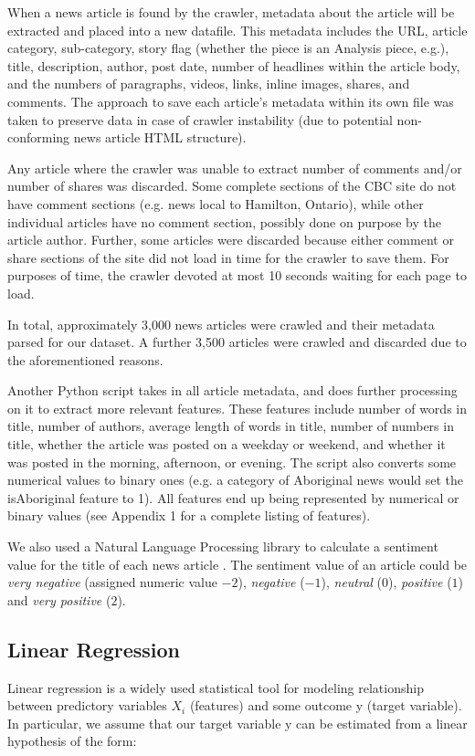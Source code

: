 \documentclass[conference,compsoc]{IEEEtran}
\begin{document}
When a news article is found by the crawler, metadata about the article will be extracted and placed into a new datafile. This metadata includes the URL, article category, sub-category, story flag (whether the piece is an Analysis piece, e.g.), title, description, author, post date, number of headlines within the article body, and the numbers of paragraphs, videos, links, inline images, shares, and comments. The approach to save each article's metadata within its own file was taken to preserve data in case of crawler instability (due to potential non-conforming news article HTML structure).

Any article where the crawler was unable to extract number of comments and/or number of shares was discarded. Some complete sections of the CBC site do not have comment sections (e.g. news local to Hamilton, Ontario), while other individual articles have no comment section, possibly done on purpose by the article author. Further, some articles were discarded because either comment or share sections of the site did not load in time for the crawler to save them. For purposes of time, the crawler devoted at most 10 seconds waiting for each page to load.

In total, approximately 3,000 news articles were crawled and their metadata parsed for our dataset. A further 3,500 articles were crawled and discarded due to the aforementioned reasons.

Another Python script takes in all article metadata, and does further processing on it to extract more relevant features. These features include number of words in title, number of authors, average length of words in title, number of numbers in title, whether the article was posted on a weekday or weekend, and whether it was posted in the morning, afternoon, or evening. The script also converts some numerical values to binary ones (e.g. a category of Aboriginal news would set the isAboriginal feature to 1). All features end up being represented by numerical or binary values (see Appendix 1 for a complete listing of features).

We also used a Natural Language Processing library to calculate a sentiment value for the title of each news article \cite{stanfordcorenlp}. The sentiment value of an article could be \textit{very negative} (assigned numeric value $-2$), \textit{negative} ($-1$), \textit{neutral} ($0$), \textit{positive} ($1$) and \textit{very positive} ($2$).

\subsection{Linear Regression}
Linear regression is a widely used statistical tool for modeling relationship between predictory variables $X_i$ (features) and some outcome y (target variable). In particular, we assume that our target variable y can be estimated from a linear hypothesis of the form:
\end{document}
